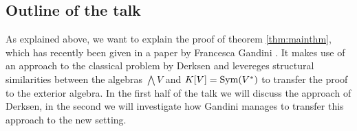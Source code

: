 \documentclass[../main.tex]{subfiles}
\begin{document}

\subsection{Outline of the talk} %
\label{sub:Outline of the talk}
As explained above, we want to explain the proof of theorem \ref{thm:mainthm},
which has recently been given in a paper by Francesca Gandini 
\cite{gandini2021degree}. It makes use of an approach to the classical 
problem by Derksen and levereges structural similarities between the algebras
$\bigwedge V$ and $K[V] = \operatorname{Sym}(V^*)$ to transfer the proof to the 
exterior algebra. In the first half of the talk we will discuss 
the approach of Derksen, in the second we will investigate how Gandini manages
to transfer this approach to the new setting.
\end{document}
